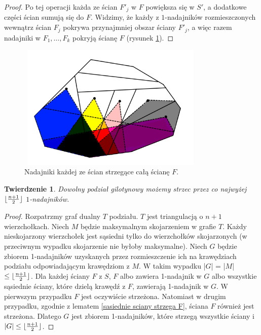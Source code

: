 \documentclass[brudnopis]{xmgr}
\DeclarePairedDelimiter\floor{\lfloor}{\rfloor}
\newtheorem{Twierdzenie}{Twierdzenie}
\theoremstyle{definition}
\begin{document}
\begin{proof}
Po tej operacji każda ze ścian $F'_j$ w $F$ powiększa się w $S'$, a dodatkowe części ścian sumują się do $F$. Widzimy, że każdy z $1$-nadajników rozmieszczonych wewnątrz ścian $F_j$ pokrywa przynajmniej obszar ściany $F'_j$, a więc razem nadajniki w $F_1,\ldots,F_k$ pokryją ścianę $F$ (rysunek \ref{fig:pokrycie f}).
\end{proof}

\begin{figure}[ht!]
  \centering
  \includegraphics[width=9cm,height=6cm]{rysunki/pokrycie_f.png}
  \caption{Nadajniki każdej ze ścian strzegące całą ścianę $F$.}
  \label{fig:pokrycie f}
\end{figure} 

\begin{Twierdzenie} \cite{knadajniki}
  Dowolny podział gilotynowy możemy strzec przez co najwyżej $\floor{\frac{n+1}{2}}$ $1$-nadajników.
\end{Twierdzenie}
\begin{proof}
	Rozpatrzmy graf dualny $T$ podziału. $T$ jest triangulacją o $n + 1$ wierzchołkach. Niech $M$ będzie maksymalnym skojarzeniem w grafie $T$. Każdy nieskojarzony wierzchołek jest sąsiedni tylko do wierzchołków skojarzonych (w przeciwnym wypadku skojarzenie nie byłoby maksymalne). Niech $G$ będzie zbiorem 1-nadajników uzyskanych przez rozmieszczenie ich na krawędziach podziału odpowiadającym krawędziom z $M$. W takim wypadku |$G$| = |$M$| $\le \floor{\frac{n+1}{2}}$. Dla każdej ściany $F$ z $S$, $F$ albo zawiera 1-nadajnik w $G$ albo wszystkie sąsiednie ściany, które dzielą krawędź z $F$, zawierają 1-nadajnik w $G$. W pierwszym przypadku $F$ jest oczywiście strzeżona. Natomiast w drugim przypadku, zgodnie z lematem \ref{sasiednie sciany strzega F}, ściana $F$ również jest strzeżona. Dlatego $G$ jest zbiorem 1-nadajników, które strzegą wszystkie ściany i $|G| \le \floor{\frac{n+1}{2}}$.
\end{proof}
\end{document}
